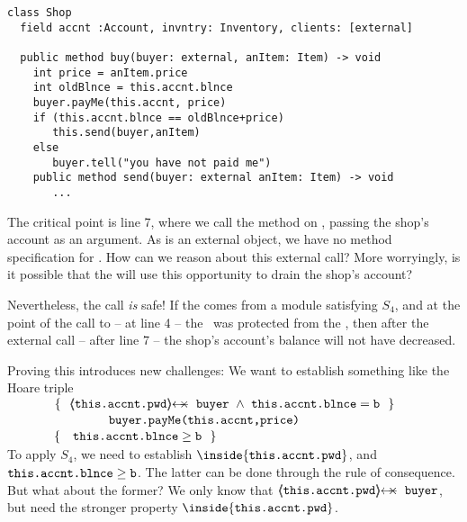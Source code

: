 \begin{lstlisting}
class Shop
  field accnt :Account, invntry: Inventory, clients: [external]    
  
  public method buy(buyer: external, anItem: Item) -> void
    int price = anItem.price
    int oldBlnce = this.accnt.blnce
    buyer.payMe(this.accnt, price)
    if (this.accnt.blnce == oldBlnce+price)
       this.send(buyer,anItem)
    else
       buyer.tell("you have not paid me") 
    public method send(buyer: external anItem: Item) -> void  
       ...            
\end{lstlisting}
 

The critical point is line 7, where we call the method   on , passing the shop's account as an argument.
As  is an external object, we have no method specification for . 
How can we reason about this external call?
More worryingly, is it possible that the  will use this opportunity  to drain the shop's account?
 
 
 \vspace{.1cm}
 {Nevertheless, the call \emph{is} safe!} If the  comes from a module satisfying $S_4$, and  at the point of the call to  -- \ie at line 4 -- the \password~was protected from the , then %
 after the external call -- \ie after line 7 --  the shop's account's balance will not have decreased.

  
  
 {Proving this introduces new challenges: We want to  establish something like the Hoare triple\\
$\strut \ \ \ \ \ \ \ \ \ \ \  \{\  \ {\protectedFrom {\prg{this.\myAccount.pwd}} {\prg{buyer}}\ \wedge\ {\prg{this.\myAccount.\balance}}=\prg{b}    }\ \  \}$\\
$\strut \ \ \ \ \ \ \ \ \ \ \   \ \ \ \ \ \ \ \ \ \ \ \ {\ \prg{buyer.payMe(this.accnt,price)}   \ } $\\
$\strut \ \ \ \ \ \ \ \ \ \ \  \{\  \ \  {\prg{this.\myAccount.\balance}} \geq  \prg{b} \  \  \}$ 
}
\\
 {%
To apply $S_4$, we need to establish  ${\inside {\prg{this.\myAccount.pwd}}}$, and  $\mbox{\normalfont{\texttt{this.\mbox{\normalfont{\texttt{accnt}}}.\mbox{\normalfont{\texttt{blnce}}}}}}\geq\mbox{\normalfont{\texttt{b}}}$. 
The latter can be done through the rule of consequence. 
But what about the former? 
We only know that $\protectedFrom {\prg{this.\myAccount.pwd}} {\prg{buyer}}$, but   need the stronger property  ${\inside {\prg{this.\myAccount.pwd}}}$.}

